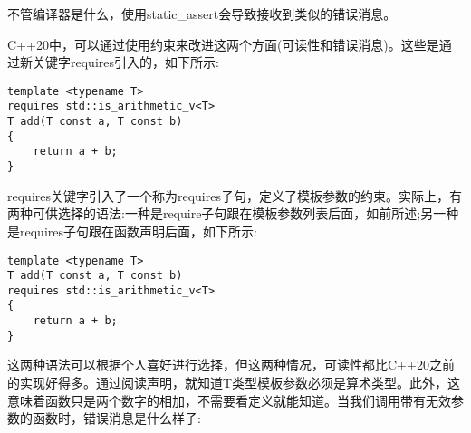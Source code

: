 不管编译器是什么，使用static\_assert会导致接收到类似的错误消息。

C++20中，可以通过使用约束来改进这两个方面(可读性和错误消息)。这些是通过新关键字requires引入的，如下所示:

\begin{lstlisting}[style=styleCXX]
template <typename T>
requires std::is_arithmetic_v<T>
T add(T const a, T const b)
{
	return a + b;
}
\end{lstlisting}

requires关键字引入了一个称为requires子句，定义了模板参数的约束。实际上，有两种可供选择的语法:一种是require子句跟在模板参数列表后面，如前所述;另一种是requires子句跟在函数声明后面，如下所示:

\begin{lstlisting}[style=styleCXX]
template <typename T>
T add(T const a, T const b)
requires std::is_arithmetic_v<T>
{
	return a + b;
}
\end{lstlisting}

这两种语法可以根据个人喜好进行选择，但这两种情况，可读性都比C++20之前的实现好得多。通过阅读声明，就知道T类型模板参数必须是算术类型。此外，这意味着函数只是两个数字的相加，不需要看定义就能知道。当我们调用带有无效参数的函数时，错误消息是什么样子:

